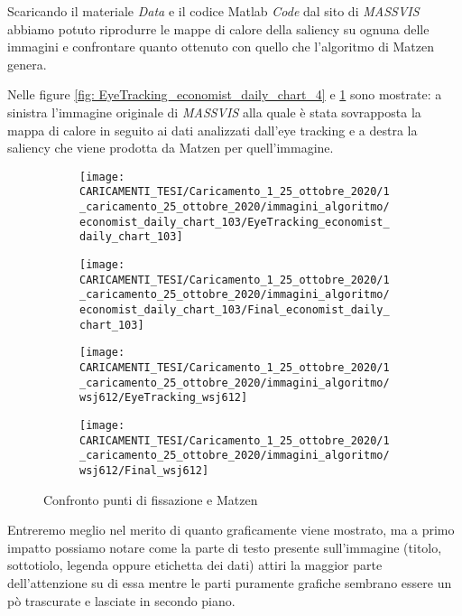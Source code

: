 \documentclass[%
	corpo=12pt,
    twoside,
    stile=classica,
    oldstyle,
    tipotesi=custom,
    greek,
    evenboxes,
]{toptesi}
\begin{document}
{Scaricando il materiale \textit{Data} e il codice Matlab \textit{Code} dal sito di \textit{MASSVIS}  abbiamo potuto riprodurre le mappe di calore della saliency su ognuna delle immagini e confrontare quanto ottenuto con quello che l'algoritmo di Matzen genera.

Nelle figure \ref{fig: EyeTracking_economist_daily_chart_4} e \ref{fig: EyeTracking_economist_daily_chart_103} sono mostrate: a sinistra l'immagine originale di \textit{MASSVIS} alla quale è stata sovrapposta la mappa di calore in seguito ai dati analizzati dall'eye tracking e a destra la saliency che viene prodotta da Matzen per quell'immagine.

\begin{figure}[!htb]\centering
\begin{subfigure}
\centering
\texttt{[image: CARICAMENTI\_TESI/Caricamento\_1\_25\_ottobre\_2020/1\_caricamento\_25\_ottobre\_2020/immagini\_algoritmo/economist\_daily\_chart\_103/EyeTracking\_economist\_daily\_chart\_103]}
\end{subfigure}
\begin{subfigure}
\centering
\texttt{[image: CARICAMENTI\_TESI/Caricamento\_1\_25\_ottobre\_2020/1\_caricamento\_25\_ottobre\_2020/immagini\_algoritmo/economist\_daily\_chart\_103/Final\_economist\_daily\_chart\_103]}
\end{subfigure}
\begin{subfigure}
\centering
\texttt{[image: CARICAMENTI\_TESI/Caricamento\_1\_25\_ottobre\_2020/1\_caricamento\_25\_ottobre\_2020/immagini\_algoritmo/wsj612/EyeTracking\_wsj612]}
\end{subfigure}
\begin{subfigure}
\centering
\texttt{[image: CARICAMENTI\_TESI/Caricamento\_1\_25\_ottobre\_2020/1\_caricamento\_25\_ottobre\_2020/immagini\_algoritmo/wsj612/Final\_wsj612]}
\end{subfigure}
\caption{Confronto punti di fissazione e Matzen}\label{fig: EyeTracking_economist_daily_chart_103}
\end{figure}

Entreremo meglio nel merito di quanto graficamente viene mostrato, ma a primo impatto possiamo notare come la parte di testo presente sull'immagine (titolo, sottotiolo, legenda oppure etichetta dei dati) attiri la maggior parte dell'attenzione su di essa mentre le parti puramente grafiche sembrano essere un pò trascurate e lasciate in secondo piano.

}
\end{document}
